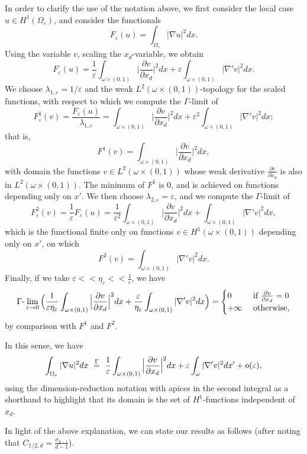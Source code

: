 \documentclass[11pt]{article}
\def\e{\varepsilon}
\begin{document}
In order to clarify the use of the notation above, we first consider the local case $u\in H^1(\Omega_\e)$,
and consider the functionals 
$$
F_\e(u)=\int_{\Omega_\e}|\nabla u|^2dx.
$$
Using the variable $v$, scaling the $x_d$-variable, we obtain
$$
F_\e(u)=\frac1\e   \int_{\omega\times (0,1)}\Big|\frac{\partial{v}}{\partial x_d}\Big|^2dx
+\e \int_{\omega\times (0,1)}|\nabla' v|^2dx.
$$
We choose $
\lambda_{1,\e}=1/\e$
and the weak $L^2(\omega\times (0,1))$-topology for the scaled functions, with respect to which we compute the $\Gamma$-limit of
$$
F^1_\e(v)=\frac{F_\e(u)}{\lambda_{1,\e}}=\int_{\omega\times (0,1)}\Big|\frac{\partial{v}}{\partial x_d}\Big|^2dx
+\e^2 \int_{\omega\times (0,1)}|\nabla' v|^2dx;
$$
that is,
$$
F^1(v)= \int_{\omega\times (0,1)}\Big|\frac{\partial{v}}{\partial x_d}\Big|^2dx,
$$
with domain the functions $v\in L^2(\omega\times (0,1))$ whose weak derivative $\frac{\partial{v}}{\partial x_d}$ is also in $L^2(\omega\times (0,1))$. The minimum of $ F^1$ is $0$, and is achieved on functions depending only on $x'$. We then choose $\lambda_{2,\e}=\e$, and we compute the $\Gamma$-limit of 
 $$
F_\e^2(v)= \frac1{\e}F_\e(u)=\frac1{\e^2}   \int_{\omega\times (0,1)}\Big|\frac{\partial{v}}{\partial x_d}\Big|^2dx
+\int_{\omega\times (0,1)}|\nabla' v|^2dx,
$$
which is the functional finite only on functions $v\in H^1(\omega\times (0,1))$ depending only on $x'$, on which
$$
F^2(v)=\int_{\omega\times (0,1)}|\nabla' v|^2dx.
$$ 
Finally, if we take $\e<\!<\eta_\e<\!<\frac1\e$, we have
$$
\Gamma\hbox{-}
\lim_{\e\to 0} \Big(\frac1{\e\eta_\e}   \int_{\omega\times (0,1)}\Big|\frac{\partial{v}}{\partial x_d}\Big|^2dx
+\frac\e{\eta_\e} \int_{\omega\times (0,1)}|\nabla' v|^2dx\Big)=\begin{cases} 0 &\hbox{ if $\frac{\partial{v}}{\partial x_d}=0$}\cr 
+\infty&\hbox{ otherwise,}
\end{cases}
$$
by comparison with $F^1$ and $F^2$.

In this sense, we have 
$$
\int_{\Omega_\e}|\nabla u|^2dx\ \buildrel\Gamma\over =\ \frac1\e   \int_{\omega\times (0,1)}\Big|\frac{\partial{v}}{\partial x_d}\Big|^2dx +\e \int_{\omega}|\nabla' v|^2dx' +o(\e),
$$
using the dimension-reduction notation with apices in the second integral as a shorthand to highlight that its domain is the set of $H^1$-functions independent of $x_d$.

\smallskip
In light of the above explanation, we can state our results as follows (after noting that $C_{1/2,d}=\frac{\sigma_{d-1}}{d-1}$).
\end{document}
